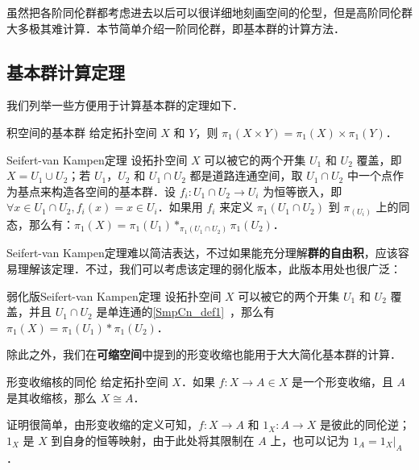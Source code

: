 

虽然把各阶同伦群都考虑进去以后可以很详细地刻画空间的伦型，但是高阶同伦群大多极其难计算．本节简单介绍一阶同伦群，即基本群的计算方法．

\subsection{基本群计算定理}

我们列举一些方便用于计算基本群的定理如下．

\begin{theorem}{积空间的基本群}
给定拓扑空间 $X$ 和 $Y$，则 $\pi_1(X\times Y)=\pi_1(X)\times\pi_1(Y)$．
\end{theorem}

\begin{theorem}{Seifert-van Kampen定理}
设拓扑空间 $X$ 可以被它的两个开集 $U_1$ 和 $U_2$ 覆盖，即 $X=U_1\cup U_2$；若 $U_1$，$U_2$ 和 $U_1\cap U_2$ 都是道路连通空间，取 $U_1\cap U_2$ 中一个点作为基点来构造各空间的基本群．设 $f_i:U_1\cap U_2\rightarrow U_i$ 为恒等嵌入，即 $\forall x\in U_1\cap U_2, f_i(x)=x\in U_i$．如果用 $f_i$ 来定义 $\pi_1(U_1\cap U_2)$ 到 $\pi_(U_i)$ 上的同态，那么有：$\pi_1(X)=\pi_1(U_1)*_{\pi_1(U_1\cap U_2)}\pi_1(U_2)$．
\end{theorem}

Seifert-van Kampen定理难以简洁表达，不过如果能充分理解\textbf{群的自由积}，应该容易理解该定理．不过，我们可以考虑该定理的弱化版本，此版本用处也很广泛：

\begin{theorem}{弱化版Seifert-van Kampen定理}
设拓扑空间 $X$ 可以被它的两个开集 $U_1$ 和 $U_2$ 覆盖，并且 $U_1\cap U_2$ 是单连通的\autoref{SmpCn_def1}~，那么有 $\pi_1(X)=\pi_1(U_1)*\pi_1(U_2)$．
\end{theorem}

除此之外，我们在\textbf{可缩空间}中提到的形变收缩也能用于大大简化基本群的计算．

\begin{theorem}{形变收缩核的同伦}\label{HomT5_the1}
给定拓扑空间 $X$．如果 $f:X\rightarrow A\in X$ 是一个形变收缩，且 $A$ 是其收缩核，那么 $X\cong A$．
\end{theorem}

证明很简单，由形变收缩的定义可知，$f:X\rightarrow A$ 和 $1_X:A\rightarrow X$ 是彼此的同伦逆；$1_X$ 是 $X$ 到自身的恒等映射，由于此处将其限制在 $A$ 上，也可以记为 $1_A=1_X|_A$．

